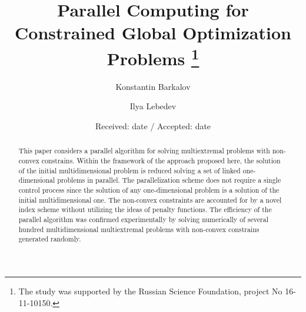 \documentclass[smallextended]{svjour3}       %
\begin{document}
\title{Parallel Computing for Constrained Global Optimization Problems
\thanks{The study was supported by the Russian Science Foundation, project No 16-11-10150.}
}


\author{Konstantin Barkalov          \and
        Ilya Lebedev %
}




\date{Received: date / Accepted: date}


\maketitle

\begin{abstract}
This paper considers a parallel algorithm for solving multiextremal problems with non-convex constrains. Within the framework of the approach proposed here, the solution of the initial multidimensional problem is reduced solving a set of linked one-dimensional problems in parallel. The parallelization scheme does not require a single control process since the solution of any one-dimensional problem is a solution of the initial multidimensional one. The non-convex constraints are accounted for by a novel index scheme without utilizing the ideas of penalty functions. The efficiency of the parallel algorithm was confirmed experimentally by solving numerically of several hundred multidimensional multiextremal problems with non-convex constrains generated randomly.
\end{abstract}
\end{document}
